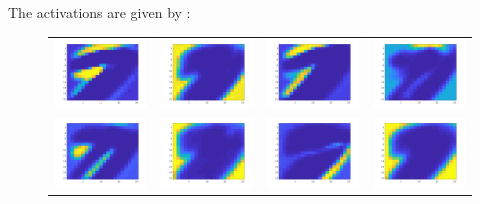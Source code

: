 \documentclass{article} %
\begin{document}
\newpage
The activations are given by : 
\begin{figure}[H]
\centering
\begin{tabular}{cccc}
\includegraphics[width=0.2\linewidth]{images/Fig_act_1.png}
&
\includegraphics[width=0.2\linewidth]{images/Fig_act_2.png}
&
\includegraphics[width=0.2\linewidth]{images/Fig_act_3.png}
&
\includegraphics[width=0.2\linewidth]{images/Fig_act_4.png}
\\
\includegraphics[width=0.2\linewidth]{images/Fig_act_5.png}
&
\includegraphics[width=0.2\linewidth]{images/Fig_act_6.png}
&
\includegraphics[width=0.2\linewidth]{images/Fig_act_7.png}
&
\includegraphics[width=0.2\linewidth]{images/Fig_act_8.png}

\end{tabular}
\end{figure}
\end{document}
